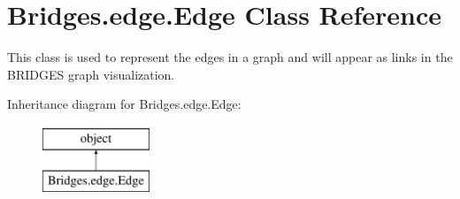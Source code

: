 \hypertarget{class_bridges_1_1edge_1_1_edge}{}\section{Bridges.\+edge.\+Edge Class Reference}
\label{class_bridges_1_1edge_1_1_edge}


This class is used to represent the edges in a graph and will appear as links in the B\+R\+I\+D\+G\+E\+S graph visualization.  


Inheritance diagram for Bridges.\+edge.\+Edge\+:\begin{figure}[H]
\begin{center}
\leavevmode
\includegraphics[height=2.000000cm]{class_bridges_1_1edge_1_1_edge}
\end{center}
\end{figure}
